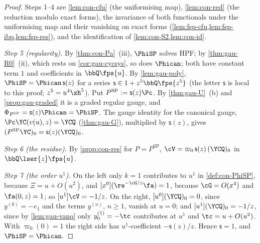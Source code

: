\begin{proof}
Steps 1--4 are \cref{lem:con-cfu} (the uniformising map), \cref{lem:con-red} (the reduction modulo exact forms), the invariance of both functionals under the uniformising map and their vanishing on exact forms (\cref{lem:fsp-cfu,lem:fsp-ibp,lem:fsp-res}), and the identification of \cref{lem:con-S2,lem:con-id}.

\emph{Step 5 (regularity).} By \cref{thm:con-Pa}~(iii), $\PhiSP$ solves HPF; by \cref{thm:gau-R0}~(ii), which rests on \cref{cor:gau-cycsys}, so does $\Phican$; both have constant term $1$ and coefficients in $\bbQ\fps{u}$. By \cref{lem:gau-poly}, $\PhiSP=\Phican\,\mathsf s(z)$ for a series $\mathsf s\in1+z^5\bbQ\fps{z^5}$ (the letter $\mathsf s$ is local to this proof; $z^5=u^4\zh^5$). Put $P^{\mathrm{SP}}:=\mathsf s(z)\Pc$. By \cref{thm:gau-U}~(b) and \cref{prop:gau-graded} it is a graded regular gauge, and $\Phi_{P^{\mathrm{SP}}}=\mathsf s(z)\Phican=\PhiSP$. The gauge identity for the canonical gauge, $\Pc\YC(v(u),z)=\YCQ$ (\cref{thm:gau-G}), multiplied by $\mathsf s(z)$, gives $(P^{\mathrm{SP}}\YC)_0=\mathsf s(z)(\YCQ)_0$.

\emph{Step 6 (the residue).} By \cref{prop:con-res} for $P=P^{\mathrm{SP}}$, $\cV=\varpi_0\,\mathsf s(z)\,(\YCQ)_0$ in $\bbQ\lser{z}\fps{u}$.

\emph{Step 7 (the order $u^1$).} On the left only $k=1$ contributes to $u^1$ in \cref{def:con-PhiSP}, because $\Xi=u+O(u^2)$, and $[x^0](\re^{-\cG/z}\fa)=1$, because $\cG=O(x^4)$ and $\fa(0,z)=1$; so $[u^1]\cV=-1/z$. On the right, $[u^0](\YCQ)_0=0$, since $y^{(0)}=-e_1$ and the terms $y^{(n)}$, $n\geq1$, vanish at $u=0$; and $[u^1](\YCQ)_0=-1/z$, since by \cref{lem:gau-vanq} only $y^{(1)}_0=-\tc$ contributes at $u^1$ and $\tc=u+O(u^2)$. With $\varpi_0(0)=1$ the right side has $u^1$-coefficient $-\mathsf s(z)/z$. Hence $\mathsf s=1$, and $\PhiSP=\Phican$.
\end{proof}


